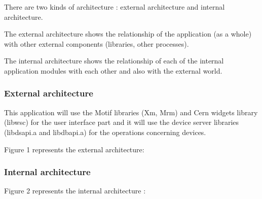 %
%
%
%
%
%
%
%
%
%
There are two kinds of architecture : external architecture and internal
architecture.

The external architecture shows the relationship of the application (as a whole)
with other external components (libraries, other processes).

The internal architecture shows the relationship of each of the internal
application modules with each other and also with the external world.

\subsubsection{External architecture}

This application will use the Motif libraries (Xm, Mrm) and Cern widgets
library (libwsc) for the user interface part and it will use the device server
libraries (libdsapi.a and libdbapi.a) for the operations concerning devices.

Figure 1 represents the external architecture:



\subsubsection{Internal architecture}

Figure 2 represents the internal architecture :



